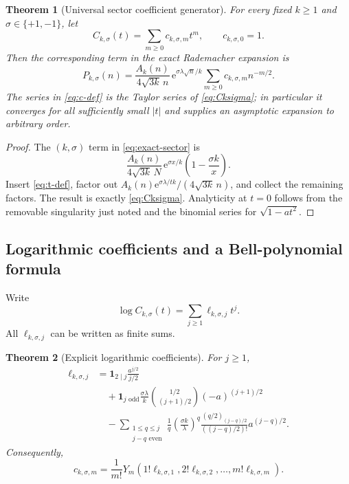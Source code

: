 \documentclass[11pt,a4paper]{article}
\numberwithin{equation}{section}
\newtheorem{theorem}{Theorem}[section]
\theoremstyle{remark}
\newcommand{\e}{\mathrm e}
\newcommand{\rising}[2]{(#1)_{#2}}
\begin{document}
\begin{theorem}[Universal sector coefficient generator]\label{thm:universal-sector-gf}
For every fixed $k\ge1$ and $\sigma\in\{+1,-1\}$, let
\begin{equation}\label{eq:c-def}
 C_{k,\sigma}(t)=\sum_{m\ge0}c_{k,\sigma,m}t^m,
 \qquad c_{k,\sigma,0}=1.
\end{equation}
Then the corresponding term in the exact Rademacher expansion is
\begin{equation}\label{eq:sector-unshifted}
 P_{k,\sigma}(n)
 =\frac{A_k(n)}{4\sqrt{3k}\,n}\,
 \e^{\sigma\lambda\sqrt n/k}
 \sum_{m\ge0}c_{k,\sigma,m}n^{-m/2}.
\end{equation}
The series in \cref{eq:c-def} is the Taylor series of \cref{eq:Cksigma}; in particular it converges for all sufficiently small $|t|$ and supplies an asymptotic expansion to arbitrary order.
\end{theorem}

\begin{proof}
The $(k,\sigma)$ term in \cref{eq:exact-sector} is
\[
 \frac{A_k(n)}{4\sqrt{3k}\,N}\,
 \e^{\sigma x/k}\left(1-\frac{\sigma k}{x}\right).
\]
Insert \cref{eq:t-def}, factor out
$A_k(n)\e^{\sigma\lambda/tk}/(4\sqrt{3k}\,n)$, and collect the remaining factors.  The result is exactly \cref{eq:Cksigma}.  Analyticity at $t=0$ follows from the removable singularity just noted and the binomial series for $\sqrt{1-at^2}$.
\end{proof}

\subsection{Logarithmic coefficients and a Bell-polynomial formula}

Write
\begin{equation}\label{eq:ell-def}
 \log C_{k,\sigma}(t)=\sum_{j\ge1}\ell_{k,\sigma,j}t^j.
\end{equation}
All $\ell_{k,\sigma,j}$ can be written as finite sums.

\begin{theorem}[Explicit logarithmic coefficients]\label{thm:ell-explicit}
For $j\ge1$,
\begin{align}
 \ell_{k,\sigma,j}
 &=\mathbf 1_{2\mid j}\frac{a^{j/2}}{j/2}
 \label{eq:ell-explicit}\\
 &\quad+\mathbf 1_{j\text{ odd}}
 \frac{\sigma\lambda}{k}
 \binom{1/2}{(j+1)/2}(-a)^{(j+1)/2}
 \nonumber\\
 &\quad-
 \sum_{\substack{1\le q\le j\\j-q\text{ even}}}
 \frac1q\left(\frac{\sigma k}{\lambda}\right)^q
 \frac{\rising{q/2}{(j-q)/2}}{((j-q)/2)!}
 a^{(j-q)/2}.
 \nonumber
\end{align}
Consequently,
\begin{equation}\label{eq:c-bell}
 c_{k,\sigma,m}
 =\frac1{m!}Y_m\!\left(
 1!\ell_{k,\sigma,1},2!\ell_{k,\sigma,2},\ldots,
 m!\ell_{k,\sigma,m}\right).
\end{equation}
\end{theorem}
\end{document}
